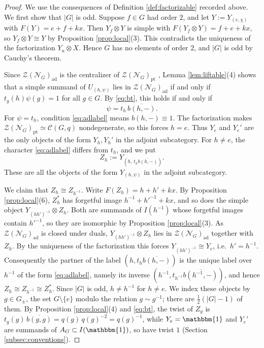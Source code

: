 \documentclass[10pt]{article}
\theoremstyle{plain}
\theoremstyle{definition}
\theoremstyle{plain}
\begin{document}
\begin{proof}
We use the consequences of Definition \ref{def:factorizable} recorded above. We first show that $|G|$ is odd. Suppose $f\in G$ had order $2$, and let $Y:=Y_{(e,\chi)}$ with $F(Y)=e+f+kx$. Then $Y_f\otimes Y$ is simple with $F(Y_f\otimes Y)=f+e+kx$, so $Y_f\otimes Y\cong Y$ by Proposition \ref{prop:local}(3). This contradicts the uniqueness of the factorization $Y_u\otimes X$. Hence $G$ has no elements of order $2$, and $|G|$ is odd by Cauchy's theorem.

\par Since $\mathcal{Z}(\mathcal{N}_G)_\mathrm{ad}$ is the centralizer of $\mathcal{Z}(\mathcal{N}_G)_\mathrm{pt}$ \cite[Corollary 3.27]{MR2609644}, Lemma \ref{lem:liftable}(4) shows that a simple summand of $U_{(h,\psi)}$ lies in $\mathcal{Z}(\mathcal{N}_G)_\mathrm{ad}$ if and only if $t_g(h)\psi(g)=1$ for all $g\in G$. By \eqref{eq:bt}, this holds if and only if
\begin{equation}\label{eq:adlabel}
  \psi=t_h\,\overline{b(h,-)}.
\end{equation}
For $\psi=t_h$, condition \eqref{eq:adlabel} means $b(h,-)\equiv1$. The factorization makes $\mathcal{Z}(\mathcal{N}_G)_\mathrm{pt}\simeq\mathcal{C}(G,q)$ nondegenerate, so this forces $h=e$. Thus $Y_e$ and $Y_e'$ are the only objects of the form $Y_h,Y_h'$ in the adjoint subcategory. For $h\neq e$, the character \eqref{eq:adlabel} differs from $t_h$, and we put
\[
Z_h:=Y_{(h,\,t_h\overline{b(h,-)})}.
\]
These are all the objects of the form $Y_{(h,\psi)}$ in the adjoint subcategory.

\par We claim that $Z_h\cong Z_{h^{-1}}$. Write $F(Z_h)=h+h'+kx$. By Proposition \ref{prop:local}(6), $Z_h^\ast$ has forgetful image $h^{-1}+h'^{-1}+kx$, and so does the simple object $Y_{(hh')^{-1}}\otimes Z_h$. Both are summands of $I(h^{-1})$ whose forgetful images contain $h'^{-1}$, so they are isomorphic by Proposition \ref{prop:local}(3). As $\mathcal{Z}(\mathcal{N}_G)_\mathrm{ad}$ is closed under duals, $Y_{(hh')^{-1}}\otimes Z_h$ lies in $\mathcal{Z}(\mathcal{N}_G)_\mathrm{ad}$ together with $Z_h$. By the uniqueness of the factorization this forces $Y_{(hh')^{-1}}\cong Y_e$, i.e.\ $h'=h^{-1}$. Consequently the partner of the label $(h,t_h\overline{b(h,-)})$ is the unique label over $h^{-1}$ of the form \eqref{eq:adlabel}, namely its inverse $(h^{-1},t_{h^{-1}}\overline{b(h^{-1},-)})$, and hence $Z_h\cong Z_{h^{-1}}\cong Z_h^\ast$. Since $|G|$ is odd, $h\neq h^{-1}$ for $h\neq e$. We index these objects by $g\in G_{\pm}$, the set $G\setminus\{e\}$ modulo the relation $g\sim g^{-1}$; there are $\frac12(|G|-1)$ of them. By Proposition \ref{prop:local}(4) and \eqref{eq:bt}, the twist of $Z_g$ is $t_g(g)\,\overline{b(g,g)}=q(g)\,q(g)^{-2}=q(g)^{-1}$, while $Y_e=\mathbbm{1}$ and $Y_e'$ are summands of $A_G\subset I(\mathbbm{1})$, so have twist $1$ (Section \ref{subsec:conventions}).


\end{proof}
\end{document}
